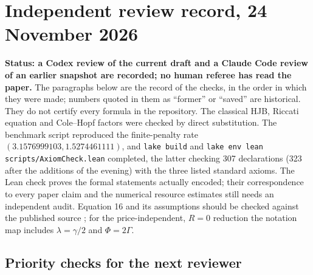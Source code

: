 \documentclass[11pt,a4paper]{article}
\begin{document}
\section*{Independent review record, 24 November 2026}

\textbf{Status: a Codex review of the current draft and a Claude Code review of an earlier snapshot are recorded; no human
referee has read the paper.} The paragraphs below are the record of the checks, in the order in which they
were made; numbers quoted in them as ``former'' or ``saved'' are historical. They do not certify every formula
in the repository.
The classical HJB, Riccati equation and Cole--Hopf factors were checked by
direct substitution. The benchmark script reproduced the finite-penalty
rate $(3.1576999103,1.5274461111)$, and \texttt{lake build} and
\texttt{lake env lean scripts/AxiomCheck.lean} completed, the latter checking
307 declarations (323 after the additions of the evening) with the three listed standard axioms. The Lean check proves
the formal statements actually encoded; their correspondence to every paper
claim and the numerical resource estimates still needs an independent audit.
Equation 16 and its assumptions should be checked against the published
source \cite{bergault2022}; for the price-independent, $R=0$ reduction the
notation map includes $\lambda=\gamma/2$ and $\Phi=2\Gamma$.

\subsection*{Priority checks for the next reviewer}
\end{document}
